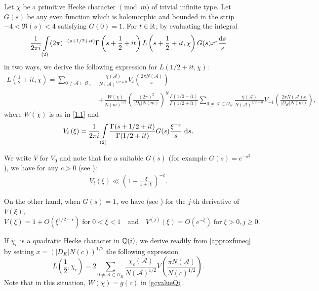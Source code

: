 \documentclass[twoside,leqno,10pt, A4]{amsart}
\begin{document}
   Let $\chi$ be a primitive Hecke character $\pmod {m}$ of trivial infinite type. Let $G(s)$ be any even function which is holomorphic and bounded in the strip $-4<\Re(s)<4$ satisfying $G(0)=1$. For $t \in \mathbb{R}$, by evaluating the integral
\begin{equation*}
   \frac {1}{2\pi
   i}\int\limits\limits_{(2)}(2\pi)^{-(s+1/2+it)}\Gamma \left( s+\frac{1}{2}+it \right)L \left( s+\frac{1}{2}+it, \chi \right)G(s) x^s \frac{\mathrm{d} s}{s}
\end{equation*}
   in two ways, we derive the following expression for $L(1/2+it, \chi)$:
\begin{equation} \label{approxfuneq}
\begin{split}
 L \left( \frac{1}{2}+it, \chi \right) = \sum_{0 \neq \mathcal{A} \subset
  \mathcal{O}_K} & \frac{\chi(\mathcal{A})}{N(\mathcal{A})^{1/2+it}}V_t \left(\frac{2\pi  N(\mathcal{A})}{x} \right) \\
  & + \frac{W(\chi)}{N(m)^{1/2}}\left(\frac {(2\pi)^2}{|D_k|N(m)} \right )^{it} \frac {\Gamma (1/2-it)}{\Gamma (1/2+it)}\sum_{0 \neq \mathcal{A} \subset
  \mathcal{O}_K}\frac{\overline{\chi}(\mathcal{A})}{N(\mathcal{A})^{1/2-it}}V_{-t}\left(\frac{2\pi
  N(\mathcal{A})x}{|D_K|N(m)} \right),
     \end{split}
\end{equation}
    where $W(\chi)$ is as in \eqref{1.1} and 
\begin{align}
\label{2.14}
  V_t \left(\xi \right)=\frac {1}{2\pi
   i}\int\limits\limits_{(2)}\frac {\Gamma(s+1/2+it)}{\Gamma (1/2+it)}G(s)\frac
   {\xi^{-s}}{s} \ \mathrm{d} s.
\end{align}

    We write $V$ for $V_0$ and note that for a suitable $G(s)$ (for example $G(s)=e^{-s^2}$), we have for any $c>0$ (see \cite[Proposition 5.4]{HIEK}):
\begin{align}
\label{2.15}
  V_t \left(\xi \right) \ll \left( 1+\frac{\xi}{1+|t|} \right)^{-c}.
\end{align}


   On the other hand, when $G(s)=1$, we have (see \cite[Lemma 2.1]{sound1}) for the $j$-th derivative of $V(\xi)$,
\begin{equation} \label{2.07}
      V\left (\xi \right) = 1+O(\xi^{1/2-\epsilon}) \; \mbox{for} \; 0<\xi<1   \quad \mbox{and} \quad V^{(j)}\left (\xi \right) =O(e^{-\xi}) \; \mbox{for} \; \xi >0, j \geq 0.
\end{equation}

If $\chi_c$ is a quadratic Hecke character in $\mathbb Q(i)$, we derive readily from \eqref{approxfuneq} by setting $x=(|D_K|N(c))^{1/2}$ the following expression
\begin{equation} \label{quadapproxfuneqQi}
 L \left( \frac{1}{2}, \chi_c \right) = 2\sum_{0 \neq \mathcal{A} \subset
  \mathcal{O}_K}\frac{\chi_c(\mathcal{A})}{N(\mathcal{A})^{1/2}}V \left(\frac{\pi N(\mathcal{A}) }{N(c)^{1/2}} \right).
  \end{equation}
Note that in this situation, $W(\chi) =g(c)$ in \eqref{gcvalueQi}. \newline
\end{document}

